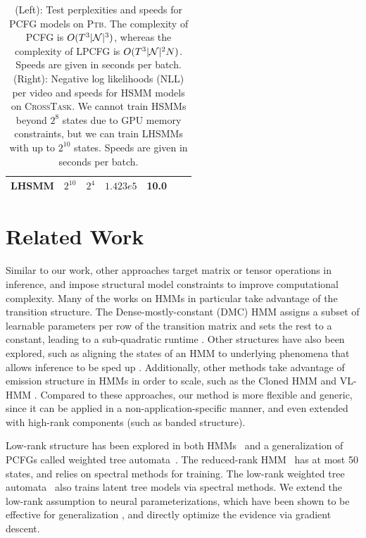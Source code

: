 \documentclass{article}
\begin{document}
\begin{table}[!t]
\begin{tabular} {lllrrrr}
LHSMM & $2^{10}$ & $2^4$ & $1.423e5$ & 10.0\\ %
\bottomrule
\end{tabular}
\vspace{.5em}
\caption{\label{tbl:cky}
(Left): Test perplexities and speeds for PCFG models on \textsc{Ptb}.
The complexity of PCFG is $O(T^3|\mathcal{N}|^3)$, whereas the complexity of LPCFG is $O(T^3 |\mathcal{N}|^2N)$.
Speeds are given in seconds per batch. %
(Right): Negative log likelihoods (NLL) per video and speeds for HSMM models on \textsc{CrossTask}.
We cannot train HSMMs beyond $2^8$ states due to GPU memory constraints,
but we can train LHSMMs with up to $2^{10}$ states.
Speeds are given in seconds per batch. %
}
\end{table}

\section{Related Work}

Similar to our work, other approaches target matrix or tensor operations in inference, and impose structural model constraints to improve computational complexity.
Many of the works on HMMs in particular take advantage of the transition structure.
The Dense-mostly-constant (DMC) HMM assigns a subset of learnable parameters per row of the transition matrix and sets the rest to a constant, leading to a sub-quadratic runtime \citep{dmc}.
Other structures have also been explored, such as aligning the states of an HMM to underlying phenomena that allows inference to be sped up \citep{ffthmm,constrainedhmm}.
Additionally, other methods take advantage of emission structure in HMMs in order to scale, such as the Cloned HMM \citep{dedieu2019learning} and VL-HMM \citep{chiu2020scaling}.
Compared to these approaches, our method is more flexible and generic, since it can be applied in a non-application-specific manner, and even extended with high-rank components (such as banded structure).

Low-rank structure has been explored in both HMMs~\citep{rrhmm} and a generalization of PCFGs called weighted tree automata~\citep{rrpcfg}. The reduced-rank HMM~\citep{rrhmm} has at most 50 states, and relies on spectral methods for training.  The low-rank weighted tree automata~\citep{rrpcfg} also trains latent tree models via spectral methods. We extend the low-rank assumption to neural parameterizations, which have been shown to be effective for generalization \citep{kim2019cpcfg,chiu2020scaling}, and directly optimize the evidence via gradient descent.
\end{document}
